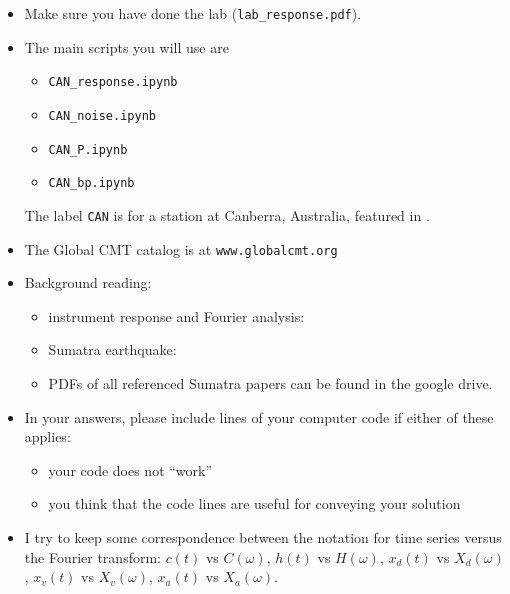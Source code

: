 \documentclass[11pt,titlepage,fleqn]{article}
\newcommand{\fft}{h}
\newcommand{\ffw}{H}
\newcommand{\tfileresponse}{{\tt CAN\_response.ipynb}}
\newcommand{\tfilenoise}{{\tt CAN\_noise.ipynb}}
\newcommand{\tfileP}{{\tt CAN\_P.ipynb}}
\newcommand{\tfilebp}{{\tt CAN\_bp.ipynb}}
\begin{document}
\begin{itemize}

\item Make sure you have done the lab (\verb+lab_response.pdf+).

\item The main scripts you will use are
%
\begin{itemize}
\item \tfileresponse\
\item \tfilenoise\
\item \tfileP\
\item \tfilebp\
\end{itemize}
%
The label \verb+CAN+ is for a station at Canberra, Australia, featured in \citet[][Figure~1]{Park2005}.


\item The Global CMT catalog is at \verb+www.globalcmt.org+

\item Background reading:

\begin{itemize}
\item instrument response and Fourier analysis: \citet[][Ch.~6]{SteinWysession}
\item Sumatra earthquake: \citep{Lay2005,Ammon2005,Park2005,Ni2005}
\item PDFs of all referenced Sumatra papers can be found in the google drive.
\end{itemize}

\item In your answers, please include lines of your computer code if either of these applies:
%
\begin{itemize}
\item your code does not ``work''
\item you think that the code lines are useful for conveying your solution
\end{itemize}

\item I try to keep some correspondence between the notation for time series versus the Fourier transform: $c(t)$ vs $C(\omega)$, $\fft(t)$ vs $\ffw(\omega)$, $x_d(t)$ vs $X_d(\omega)$, $x_v(t)$ vs $X_v(\omega)$, $x_a(t)$ vs $X_a(\omega)$.

\end{itemize}
\end{document}
